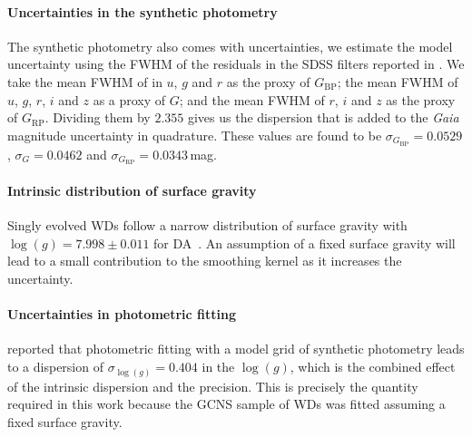 \documentclass[fleqn,usenatbib]{mnras}
\begin{document}
\paragraph{Uncertainties in the synthetic photometry \hfill\\}
\label{sec:synthetic_photometry}
The synthetic photometry also comes with uncertainties, we estimate the model
uncertainty using the FWHM of the residuals in the SDSS filters reported in
\citet{2006AJ....132.1221H}. We take the mean FWHM of in $u$, $g$ and $r$ as
the proxy of $G_{\mathrm{BP}}$; the mean FWHM of $u$, $g$, $r$, $i$ and $z$
as a proxy of $G$; and the mean FWHM of $r$, $i$ and $z$ as the proxy of
$G_{\mathrm{RP}}$. Dividing them by $2.355$ gives us the dispersion that is
added to the \textit{Gaia} magnitude uncertainty in quadrature. These values are found
to be $\sigma_{G_{\mathrm{BP}}}=0.0529$,
$\sigma_{G}=0.0462$ and $\sigma_{G_{\mathrm{RP}}}=0.0343$\,mag.

\paragraph{Intrinsic distribution of surface gravity \hfill\\}
\label{sec:logg_intrinsic_dispersion}
Singly evolved WDs follow a narrow distribution of surface gravity with
$\log(g)=7.998 \pm 0.011$ for DA~\citep{2021MNRAS.507.4646K}. An assumption
of a fixed surface gravity will lead to a small contribution to the smoothing
kernel as it increases the uncertainty.

\paragraph{Uncertainties in photometric fitting \hfill\\}
\label{sec:logg_photometric_fitting}
\citet{2014ApJ...796..128G} reported that photometric fitting with a model
grid of synthetic photometry leads to a dispersion of
$\sigma_{\log(g)} = 0.404$ in the $\log(g)$, which is the combined
effect of the intrinsic dispersion and the precision. This is precisely the
quantity required in this work because the GCNS sample of WDs was fitted
assuming a fixed surface gravity.
\end{document}
